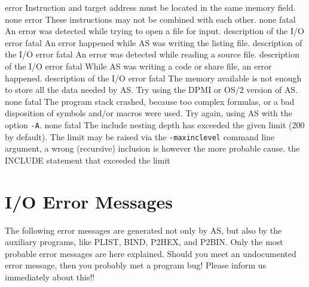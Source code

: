 \documentclass[12pt,twoside]{report}
\newcommand{\tty}[1]{{\tt #1}}
\newcommand{\asname}{{AS}}
\begin{document}
\begin{description}
               {error}
               {Instruction and target address must be located in the
                same memory field.}
               {none}
               {error}
               {These instructions may not be combined with each other.}
               {none}
               {fatal}
               {An error was detected while trying to open a file for input.}
               {description of the I/O error}
               {fatal}
               {An error happened while \asname{} was writing the listing file.}
               {description of the I/O error}
               {fatal}
               {An error was detected while reading a source file.}
               {description of the I/O error}
               {fatal}
               {While \asname{} was writing a code or share file, an error happened.}
               {description of the I/O error}
               {fatal}
               {The memory available is not enough to store all the data
                needed by \asname{}. Try using the DPMI or OS/2 version of \asname{}.}
               {none}
               {fatal}
               {The program stack crashed, because too complex formulas, or
                a bad disposition of symbols and/or macros were used. Try
                again, using \asname{} with the option \tty{-A}.}
               {none}
               {fatal}
               {The include nesting depth has exceeded the given limit (200
                by default). The limit may be raised via the {\tt -maxinclevel}
                command line argument, a wrong (recursive) inclusion is however
                the more probable cause.}
               {the INCLUDE statement that exceeded the limit}
\end{description}


\cleardoublepage
\chapter{I/O Error Messages}

The following error messages are generated not only by \asname{}, but also by
the auxiliary programs, like PLIST, BIND, P2HEX, and P2BIN. Only the most
probable error messages are here explained. Should you meet an undocumented
error message, then you probably met a program bug! Please inform us
immediately about this!!
\end{document}
